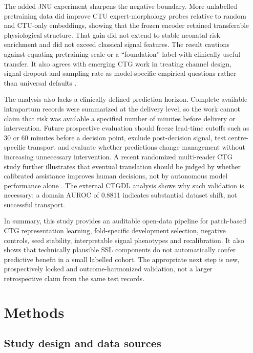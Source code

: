 \documentclass[utf8]{FrontiersinHarvard}
\begin{document}
The added JNU experiment sharpens the negative boundary. More unlabelled pretraining data did improve CTU expert-morphology probes relative to random and CTU-only embeddings, showing that the frozen encoder retained transferable physiological structure. That gain did not extend to stable neonatal-risk enrichment and did not exceed classical signal features. The result cautions against equating pretraining scale or a ``foundation'' label with clinically useful transfer. It also agrees with emerging CTG work in treating channel design, signal dropout and sampling rate as model-specific empirical questions rather than universal defaults \citep{mendis2025crossdatabase,prismctg2026,fridman2026ctgfoundation}.

The analysis also lacks a clinically defined prediction horizon. Complete available intrapartum records were summarized at the delivery level, so the work cannot claim that risk was available a specified number of minutes before delivery or intervention. Future prospective evaluation should freeze lead-time cutoffs such as 30 or 60 minutes before a decision point, exclude post-decision signal, test centre-specific transport and evaluate whether predictions change management without increasing unnecessary intervention. A recent randomized multi-reader CTG study further illustrates that eventual translation should be judged by whether calibrated assistance improves human decisions, not by autonomous model performance alone \citep{benmbarek2026humanai}. The external CTGDL analysis shows why such validation is necessary: a domain AUROC of 0.8811 indicates substantial dataset shift, not successful transport.

In summary, this study provides an auditable open-data pipeline for patch-based CTG representation learning, fold-specific development selection, negative controls, seed stability, interpretable signal phenotypes and recalibration. It also shows that technically plausible SSL components do not automatically confer predictive benefit in a small labelled cohort. The appropriate next step is new, prospectively locked and outcome-harmonized validation, not a larger retrospective claim from the same test records.

\section{Methods}

\subsection{Study design and data sources}
\end{document}
